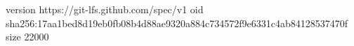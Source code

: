 version https://git-lfs.github.com/spec/v1
oid sha256:17aa1bed8d19eb0fb08b4d88ae9320a884c734572f9e6331c4ab84128537470f
size 22000
